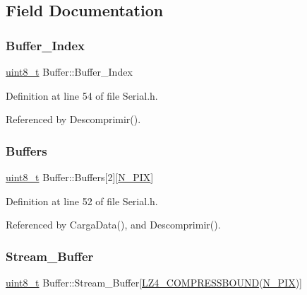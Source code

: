 \subsection{Field Documentation}
\mbox{\label{structBuffer_a4b7b77de63c2c7d070aed73400f06d61}} 
\subsubsection{\texorpdfstring{Buffer\+\_\+\+Index}{Buffer\_Index}}
{\footnotesize\ttfamily \mbox{\hyperlink{RegsLPC1769_8h_aba7bc1797add20fe3efdf37ced1182c5}{uint8\+\_\+t}} Buffer\+::\+Buffer\+\_\+\+Index}



Definition at line 54 of file Serial.\+h.



Referenced by Descomprimir().

\mbox{\label{structBuffer_aa46fd86a8467fd9c22e27aecd2ce5a6c}} 
\subsubsection{\texorpdfstring{Buffers}{Buffers}}
{\footnotesize\ttfamily \mbox{\hyperlink{RegsLPC1769_8h_aba7bc1797add20fe3efdf37ced1182c5}{uint8\+\_\+t}} Buffer\+::\+Buffers\mbox{[}2\mbox{]}\mbox{[}\mbox{\hyperlink{Serial_8h_af6da69ccda8aa07b1fafe1db53bd4051}{N\+\_\+\+P\+IX}}\mbox{]}}



Definition at line 52 of file Serial.\+h.



Referenced by Carga\+Data(), and Descomprimir().

\mbox{\label{structBuffer_a8f92727e7b44eade72f7770483f92e40}} 
\subsubsection{\texorpdfstring{Stream\+\_\+\+Buffer}{Stream\_Buffer}}
{\footnotesize\ttfamily \mbox{\hyperlink{RegsLPC1769_8h_aba7bc1797add20fe3efdf37ced1182c5}{uint8\+\_\+t}} Buffer\+::\+Stream\+\_\+\+Buffer\mbox{[}\mbox{\hyperlink{lz4_8h_a2453a423fd34640a0afbbf57ed0a5399}{L\+Z4\+\_\+\+C\+O\+M\+P\+R\+E\+S\+S\+B\+O\+U\+ND}}(\mbox{\hyperlink{Serial_8h_af6da69ccda8aa07b1fafe1db53bd4051}{N\+\_\+\+P\+IX}})\mbox{]}}




